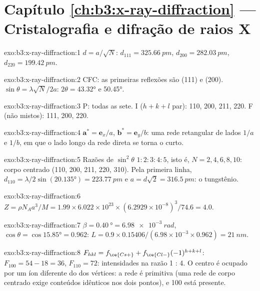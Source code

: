 \section*{Capítulo \ref{ch:b3:x-ray-diffraction} --- Cristalografia e difração de raios X}

\begin{solution}{exo:b3:x-ray-diffraction:1}
$d = a/\sqrt N$: $d_{111} = \qty{325.66}{pm}$, $d_{200} = \qty{282.03}{pm}$, $d_{220} =
\qty{199.42}{pm}$.
\end{solution}

\begin{solution}{exo:b3:x-ray-diffraction:2}
CFC: as primeiras reflexões são (111) e (200). $\sin\theta = \lambda\sqrt N/2a$: $2\theta =
\ang{43.32}$ e \ang{50.45}.
\end{solution}

\begin{solution}{exo:b3:x-ray-diffraction:3}
P: todas as sete. I ($h + k + l$ par): 110, 200, 211, 220. F (não mistos): 111, 200, 220.
\end{solution}

\begin{solution}{exo:b3:x-ray-diffraction:4}
$\mathbf a^* = \mathbf e_x/a$, $\mathbf b^* = \mathbf e_y/b$: uma rede retangular de lados $1/a$
e $1/b$, em que o lado longo da rede direta se torna o curto.
\end{solution}

\begin{solution}{exo:b3:x-ray-diffraction:5}
Razões de $\sin^2\theta$ $1 : 2 : 3 : 4 : 5$, isto é, $N = 2, 4, 6, 8, 10$: corpo centrado (110,
200, 211, 220, 310). Pela primeira linha, $d_{110} = \lambda/2\sin(\ang{20.135}) =
\qty{223.77}{pm}$ e $a = d\sqrt2 = \qty{316.5}{pm}$: o tungstênio.
\end{solution}

\begin{solution}{exo:b3:x-ray-diffraction:6}
$Z = \rho N_Aa^3/M = 1.99 \times 6.022\times10^{23} \times (6.2929\times10^{-8})^3/74.6 = 4.0$.
\end{solution}

\begin{solution}{exo:b3:x-ray-diffraction:7}
$\beta = \qty{0.40}{\degree} = \qty{6.98e-3}{rad}$, $\cos\theta = \cos\ang{15.85} = 0.962$:
$L = 0.9 \times 0.15406/(6.98\times10^{-3} \times 0.962) = \qty{21}{nm}$.
\end{solution}

\begin{solution}{exo:b3:x-ray-diffraction:8}
$F_{hkl} = f_{\ce{Cs+}} + f_{\ce{Cl-}}(-1)^{h+k+l}$: $F_{100} = 54 - 18 = 36$, $F_{110} = 72$:
intensidades na razão 1 : 4. O centro é ocupado por um íon diferente do dos
vértices: a rede é primitiva (uma rede de corpo centrado exige conteúdos idênticos
nos dois pontos), e 100 está presente.
\end{solution}

